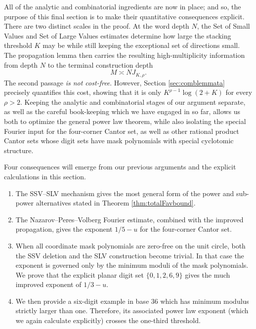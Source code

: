 \documentclass[12pt]{amsart}
\numberwithin{equation}{section}
\begin{document}
All of the analytic and combinatorial ingredients are now in place; and so, the
purpose of this final section is to make their quantitative consequences
explicit.  There are two distinct scales in the proof.  At the word depth
$N$, the Set of Small Values and Set of Large Values estimates determine how large the stacking threshold $K$
may be while still keeping the exceptional set of directions small.  The
propagation lemma then carries the resulting high-multiplicity information
from depth $N$ to the terminal construction depth
\[
 M\asymp NJ_{K,\rho}.
\]
The second passage \textit{is not cost-free}. However, Section \ref{sec:comblemmata} precisely quantifies this cost, showing that it is only $K^{\rho-1}\log(2+K)$ for every $\rho>2$.  Keeping the
analytic and combinatorial stages of our argument separate, as well as the careful book-keeping which we have engaged in so far, allows us both to optimize the general power law theorem, while also isolating the special Fourier input for the four-corner Cantor set, as well as other rational product Cantor sets whose digit sets have mask polynomials with special cyclotomic structure.

Four consequences will emerge from our previous arguments and the explicit calculations in this section.
\begin{enumerate}
\item The SSV--SLV mechanism gives the most general form of
the power and sub-power alternatives stated in Theorem \ref{thm:totalFavbound}.
\medskip
\item The Nazarov--Peres--Volberg Fourier estimate, combined with the
improved propagation, gives the exponent $1/5-u$ for the four-corner Cantor
set.
\medskip
\item When all coordinate mask polynomials are zero-free on the unit
circle, both the SSV deletion and the SLV construction become trivial.  In
that case the exponent is governed only by the minimum moduli of the mask
polynomials. We prove that the explicit planar digit set $\{0,1,2,6,9\}$ gives the much improved exponent of
$1/3-u$.
\medskip
\item We then provide a six-digit example in base $36$ which has minimum modulus strictly larger than one. Therefore, its associated power law exponent (which we again calculate explicitly) crosses the one-third threshold.
\end{enumerate}
\end{document}
